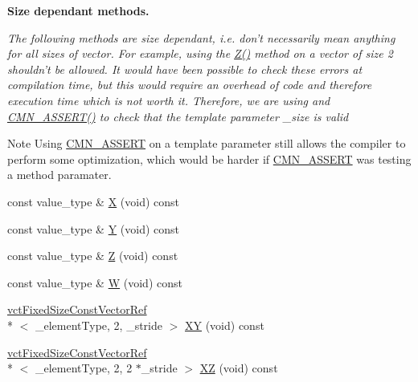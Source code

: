 \begin{Indent}{\bf Size dependant methods.}\par
{\em The following methods are size dependant, i.\-e. don't necessarily mean anything for all sizes of vector. For example, using the \hyperlink{classvct_fixed_size_const_vector_base_a7512e09f861dd14a4953184ba21bea65}{Z()} method on a vector of size 2 shouldn't be allowed. It would have been possible to check these errors at compilation time, but this would require an overhead of code and therefore execution time which is not worth it. Therefore, we are using and \hyperlink{group__cisst_common_ga6a12b7031ea38ac5bf5937b8633c97ff}{C\-M\-N\-\_\-\-A\-S\-S\-E\-R\-T()} to check that the template parameter \-\_\-size is valid

\begin{DoxyNote}{Note}
Using \hyperlink{group__cisst_common_ga6a12b7031ea38ac5bf5937b8633c97ff}{C\-M\-N\-\_\-\-A\-S\-S\-E\-R\-T} on a template parameter still allows the compiler to perform some optimization, which would be harder if \hyperlink{group__cisst_common_ga6a12b7031ea38ac5bf5937b8633c97ff}{C\-M\-N\-\_\-\-A\-S\-S\-E\-R\-T} was testing a method paramater. 
\end{DoxyNote}
}\begin{DoxyCompactItemize}
\item 
const value\-\_\-type \& \hyperlink{classvct_fixed_size_const_vector_base_ab4c73c8ed62e07d70b60f176fec6a6a4}{X} (void) const 
\item 
const value\-\_\-type \& \hyperlink{classvct_fixed_size_const_vector_base_acd49ac5b86c51004025038feaee9b207}{Y} (void) const 
\item 
const value\-\_\-type \& \hyperlink{classvct_fixed_size_const_vector_base_a7512e09f861dd14a4953184ba21bea65}{Z} (void) const 
\item 
const value\-\_\-type \& \hyperlink{classvct_fixed_size_const_vector_base_a9159e8044eaf25afd14bf29b4896cb2e}{W} (void) const 
\item 
\hyperlink{classvct_fixed_size_const_vector_ref}{vct\-Fixed\-Size\-Const\-Vector\-Ref}\\*
$<$ \-\_\-element\-Type, 2, \-\_\-stride $>$ \hyperlink{classvct_fixed_size_const_vector_base_a37dd8ddaeed8782eba28c4ed33df976c}{X\-Y} (void) const 
\item 
\hyperlink{classvct_fixed_size_const_vector_ref}{vct\-Fixed\-Size\-Const\-Vector\-Ref}\\*
$<$ \-\_\-element\-Type, 2, 2 $\ast$\-\_\-stride $>$ \hyperlink{classvct_fixed_size_const_vector_base_abfc16233497e3ad6111483a8ec40a317}{X\-Z} (void) const 

\end{DoxyCompactItemize}
\end{Indent}
